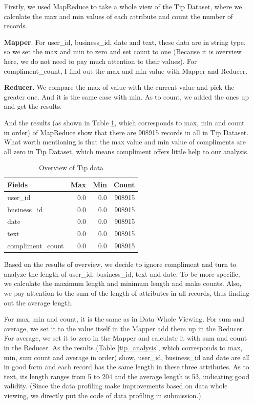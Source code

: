 \documentclass{stylefiles/capstone}
\begin{document}
Firstly, we used MapReduce to take a whole view of the Tip Dataset, where we calculate the max and min values of each attribute and count the number of records. 

\textbf{Mapper}. For user\_id, business\_id, date and text, these data are in string type, so we set the max and min to zero and set count to one (Because it is overview here, we do not need to pay much attention to their values). For compliment\_count, I find out the max and min value with Mapper and Reducer. 

\textbf{Reducer}. We compare the max of value with the current value and pick the greater one. And it is the same case with min. As to count, we added the ones up and get the results.

And the results (as shown in Table \ref{tip_overview}, which corresponds to max, min and count in order) of MapReduce show that there are 908915 records in all in Tip Dataset. What worth mentioning is that the max value and min value of compliments are all zero in Tip Dataset, which means compliment offers little help to our analysis.

\begin{table}[h!]
\centering
\begin{tabular}{l r r r} 
 \hline
 Fields & Max & Min & Count \\ [0.5ex] 
 \hline
user\_id &  0.0 & 0.0 &  908915 \\
business\_id  &  0.0 &  0.0 &  908915\\
date &  0.0  &  0.0  &  908915\\
text &  0.0  &  0.0  &  908915\\
compliment\_count  &  0.0 &  0.0  &  908915\\
 [1ex] 
 \hline
\end{tabular}
\caption{Overview of Tip data}
\label{tip_overview}
\end{table}

Based on the results of overview, we decide to ignore compliment and turn to analyze the length of user\_id, business\_id, text and date. To be more specific, we calculate the maximum length and minimum length and make counts. Also, we pay attention to the sum of the length of attributes in all records, thus finding out the average length.

For max, min and count, it is the same as in Data Whole Viewing. For sum and average, we set it to the value itself in the Mapper add them up in the Reducer. For average, we set it to zero in the Mapper and calculate it with sum and count in the Reducer.
As the results (Table \ref{tip_analysis}, which corresponds to max, min, sum count and average in order) show, user\_id, business\_id and date are all in good form and each record has the same length in these three attributes. As to text, its length ranges from 5 to 204 and the average length is 53, indicating good validity. (Since the data profiling make improvements based on data whole viewing, we directly put the code of data profiling in submission.)
\end{document}
